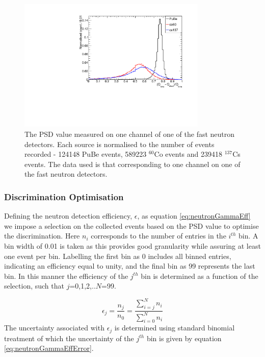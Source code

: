 \begin{figure}[htbp]
\begin{center}
\includegraphics[width=90mm]{Chapter8/figures/psd_allSources_noCf252_linear.pdf}
\caption{The PSD value measured on one channel of one of the fast neutron detectors. Each source is normalised to the number of events recorded - 124148 PuBe events, 589223 $^{60}$Co events and 239418 $^{137}$Cs events. The data used is that corresponding to one channel on one of the fast neutron detectors.}
\label{fig:modesSourcesPSDComparision}
\end{center}
\end{figure}

\subsubsection{Discrimination Optimisation}
Defining the neutron detection efficiency, $\epsilon$, as equation \ref{eq:neutronGammaEff} we impose a selection on the collected events based on the PSD value to optimise the discrimination. Here $n_{i}$ corresponds to the number of entries in the $i^{th}$ bin. A bin width of 0.01 is taken as this provides good granularity while assuring at least one event per bin. Labelling the first bin as 0 includes all binned entries, indicating an efficiency equal to unity, and the final bin as 99 represents the last bin. In this manner the efficiency of the $j^{th}$ bin is determined as a function of the selection, such that $j$=0,1,2,..$N$=99. 

\begin{equation}
\epsilon_{j} = \frac{n_{j}}{n_{0}} = \frac{\sum^{N}_{i=j}{n_{i}}}{\sum^{N}_{i=0}{n_{i}}}
\label{eq:neutronGammaEff}
\end{equation}
The uncertainty associated with $\epsilon_{j}$ is determined using standard binomial treatment of which the uncertainty of the $j^{th}$ bin is given by equation \ref{eq:neutronGammaEffError}.

